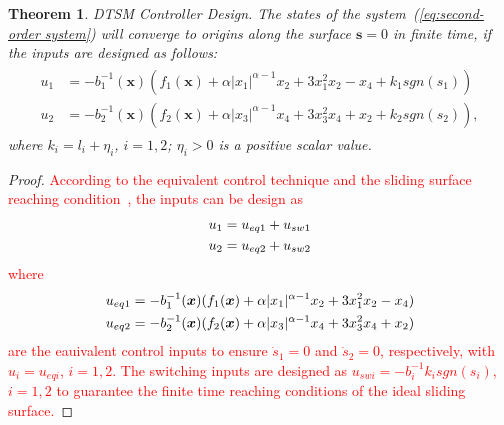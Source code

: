 \documentclass[3p]{elsarticle}
\theoremstyle{plain}
\newtheorem{mythm}{Theorem}
\theoremstyle{remark}
\begin{document}
\begin{mythm}\label{theorem:1}DTSM Controller Design. The states of the system~(\ref{eq:second-order system}) will converge to origins along the surface $\bm s=0$ in finite time, if the inputs are designed as follows:
\begin{align}
\begin{split}
u_1 &= -b_1^{-1}(\bm x)(f_1(\bm x)+\alpha\vert x_1\vert^{\alpha-1}x_2+3x_1^2x_2-x_4+k_1sgn(s_1))\\
u_2 &= -b_2^{-1}(\bm x)(f_2(\bm x)+\alpha\vert x_3\vert^{\alpha-1}x_4+3x_3^2x_4+x_2+k_2sgn(s_2)),\label{eq:DSM input}
\end{split}
\end{align}
where $k_i = l_i+\eta_i$, $i=1,2$; $\eta_i>0$ is a positive scalar value.
\end{mythm}
\begin{proof}
\textcolor{red}{According to the equivalent control technique and the sliding surface reaching condition~\cite{Arie1993sliding}, the inputs can be design as
\begin{align}\begin{split}
u_1 &= u_{eq1}+u_{sw1}\\
u_2 &= u_{eq2}+u_{sw2}\notag
\end{split}\end{align}
where
\begin{align}\begin{split}
u_{eq1} &= -b_1^{-1}(\bm x)(f_1(\bm x)+\alpha\vert x_1\vert^{\alpha-1}x_2+3x_1^2x_2-x_4)\\
u_{eq2} &= -b_2^{-1}(\bm x)(f_2(\bm x)+\alpha\vert x_3\vert^{\alpha-1}x_4+3x_3^2x_4+x_2)\notag
\end{split}\end{align}
are the eauivalent control inputs to ensure $\dot s_1 = 0$ and $\dot s_2=0$, respectively, with $u_i = u_{eqi}$, $i=1,2$. The switching inputs are designed as $u_{swi}=-b_i^{-1}k_isgn(s_i)$, $i=1,2$ to guarantee the finite time reaching conditions of the ideal sliding surface.}


\end{proof}
\end{document}
